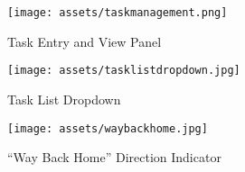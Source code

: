 \documentclass{article}
\begin{document}
\begin{figure}[!htb]
  \centering
  \texttt{[image: assets/taskmanagement.png]}
  \caption{Task Entry and View Panel}
  \label{fig:taskmanagment}
\end{figure}

\begin{figure}[!htb]
  \centering
  \texttt{[image: assets/tasklistdropdown.jpg]}
  \caption{Task List Dropdown}
  \label{fig:tasklistdropdown}
\end{figure}

\pagebreak

\begin{figure}[!htb]
  \centering
  \texttt{[image: assets/waybackhome.jpg]}
  \caption{“Way Back Home” Direction Indicator}
  \label{fig:wayhome}
\end{figure}
\end{document}
